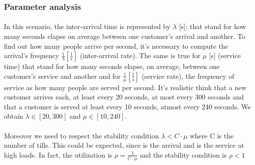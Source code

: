 \subsubsection{Parameter analysis}
\paragraph{} 
In this scenario, the inter-arrival time is represented by $\lambda$ [s]; that stand for how many seconds elapse on average between one customer's arrival and another. To find out how many people arrive per second, it's necessary to compute the arrival's frequency $\frac{1}{\lambda} [\frac{1}{s}]$ (inter-arrival rate). The same is true for $\mu$ [s] (service time) that stand for how many seconds elapse, on average, between one customer's service and another and for $\frac{1}{\mu} [\frac{1}{s}]$ (service rate), the frequency of service as how many people are served per second. It's realistic think that a new customer arrives each, at least every 20 seconds, at most every 300 seconds and that a customer is served at least every 10 seconds, atmost every 240 seconds. We obtain $\lambda \in [20, 300]$ and $\mu \in [10, 240]$. \\
\paragraph{} Moreover we need to respect the stability condition $\lambda < C\cdot \mu$ where C is the number of tills. This could be expected, since \lambda is the arrival and \mu is the service at high loads. In fact, the utilization is $\rho = \frac{\lambda }{C\cdot \mu}$ and the stability condition is $\rho < 1$  


